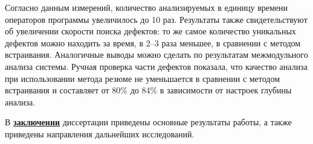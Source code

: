 Согласно данным измерений, количество анализируемых в единицу времени операторов программы увеличилось до 10 раз. Результаты также свидетельствуют об увеличении скорости поиска дефектов: то же самое количество уникальных дефектов можно находить за время, в 2--3 раза меньшее, в сравнении с методом встраивания. Аналогичные выводы можно сделать по результатам межмодульного анализа системы. Ручная проверка части дефектов показала, что качество анализа при использовании метода резюме не уменьшается в сравнении с методом встраивания и составляет от 80\% до 84\% в зависимости от настроек глубины анализа.

В \underline{\textbf{заключении}} диссертации приведены основные результаты работы, а также приведены направления дальнейших исследований.%

